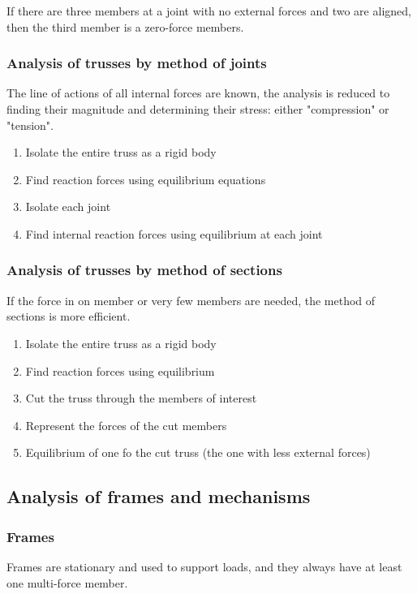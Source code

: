 \documentclass[10pt, twocolumn]{article}
\begin{document}
If there are three members at a joint with no external forces and two are aligned, then the third member is a zero-force members.

\subsubsection{Analysis of trusses by method of joints}
The line of actions of all internal forces are known, the analysis is reduced to finding their magnitude and determining their stress: either "compression" or "tension".

\begin{enumerate}
  \item Isolate the entire truss as a rigid body
  \item Find reaction forces using equilibrium equations
  \item Isolate each joint
  \item Find internal reaction forces using equilibrium at each joint
\end{enumerate}

\subsubsection{Analysis of trusses by method of sections}
If the force in on member or very few members are needed, the method of sections is more efficient.

\begin{enumerate}
  \item Isolate the entire truss as a rigid body
  \item Find reaction forces using equilibrium
  \item Cut the truss through the members of interest
  \item Represent the forces of the cut members
  \item Equilibrium of one fo the cut truss (the one with less external forces)
\end{enumerate}

\subsection{Analysis of frames and mechanisms}
\subsubsection{Frames}
Frames are stationary and used to support loads, and they always have at least one multi-force member.
\end{document}
